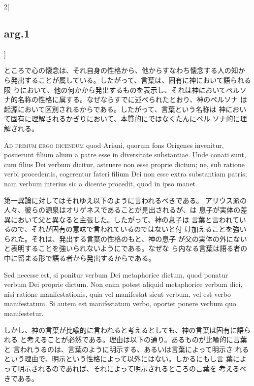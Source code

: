 \documentclass[paper=a4paper,fontsize=10pt,jafontsize=9pt,titlepage]{jlreq}
\begin{document}
\begin{paracol}{2}[\subsection{arg.1}]
\switchcolumn

ところで心の懐念は、それ自身の性格から、他からすなわち懐念する人の知か
 ら発出することが属している。したがって、言葉は、固有に神において語られる限
 りにおいて、他の何かから発出するものを表示し、それは神においてペルソ
 ナ的名称の性格に属する。なぜならすでに述べられたとおり、神のペルソナ
 は起源において区別されるからである。したがって、言葉という名称は
 神において固有に理解されるかぎりにおいて、本質的にではなくたんにペル
 ソナ的に理解される。

\switchcolumn*[\subsection{ad.1}]

{\scshape Ad primum ergo dicendum} quod Ariani, quorum fons Origenes invenitur,
 posuerunt filium alium a patre esse in diversitate substantiae. Unde
 conati sunt, cum filius Dei verbum dicitur, astruere non esse proprie
 dictum; ne, sub ratione verbi procedentis, cogerentur fateri filium
 Dei non esse extra substantiam patris; nam verbum interius sic a
 dicente procedit, quod in ipso manet.

\switchcolumn

第一異論に対してはそれゆえ以下のように言われるべきである。
アリウス派の人々、彼らの源泉はオリゲネスであることが見出されるが、は
 息子が実体の差異において父と異なると主張した。したがって、神の息子は
 言葉と言われているので、それが固有の意味で言われているのではないと付
 け加えることを強いられた。それは、発出する言葉の性格のもと、神の息子
 が父の実体の外にないと表明することを強いられないようにである。なぜな
 ら内なる言葉は語る者の中に留まる形で語る者から発出するからである。

\switchcolumn*

Sed necesse est, si ponitur
 verbum Dei metaphorice dictum, quod ponatur verbum Dei proprie
 dictum. Non enim potest aliquid metaphorice verbum dici, nisi ratione
 manifestationis, quia vel manifestat sicut verbum, vel est verbo
 manifestatum. Si autem est manifestatum verbo, oportet ponere verbum
 quo manifestetur.

\switchcolumn

しかし、神の言葉が比喩的に言われると考えるとしても、神の言葉は固有に語られる
 と考えることが必然である。理由は以下の通り。あるものが比喩的に言葉と
 言われうるのは、言葉のように明示する、あるいは言葉によって明示さ
 れるという理由で、明示という性格によって以外にはない。しかるにもし言
 葉によって明示されるのであれば、それによって明示されるところの言葉を
 考えるべきである。


\end{paracol}
\end{document}
